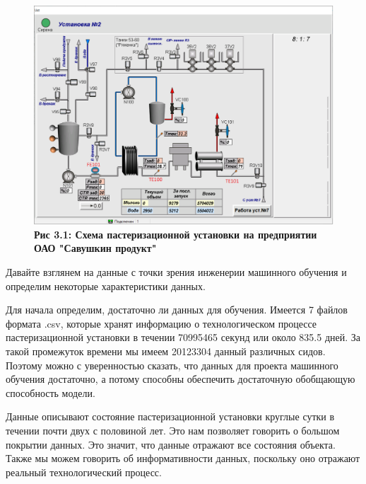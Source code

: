 {  \begin{figure}
    \centering
    \def\svgwidth{\textwidth}
    \includegraphics[width=\textwidth]{images/paster.png}
    \caption{\bfseries Рис 3.1: Схема пастеризационной установки на предприятии ОАО "Савушкин продукт"}
    \label{fig:NNBlackBox}
  \end{figure}

  \par \redline Давайте взглянем на данные с точки зрения инженерии машинного обучения и определим некоторые характеристики данных. 

  \par \redline Для начала определим, достаточно ли данных для обучения. Имеется 7 файлов формата .csv, которые хранят информацию о технологическом процессе пастеризационной установки в течении 70995465 секунд или около 835.5 дней. За такой промежуток времени мы имеем 20123304 данный различных сидов. Поэтому можно с уверенностью сказать, что данных для проекта машинного обучения достаточно, а потому способны обеспечить достаточную обобщающую способность модели.

  \par \redline Данные описывают состояние пастеризационной установки круглые сутки в течении почти двух с половиной лет. Это нам позволяет говорить о большом покрытии данных. Это значит, что данные отражают все состояния объекта. Также мы можем говорить об информативности данных, поскольку оно отражают реальный технологический процесс.

}
